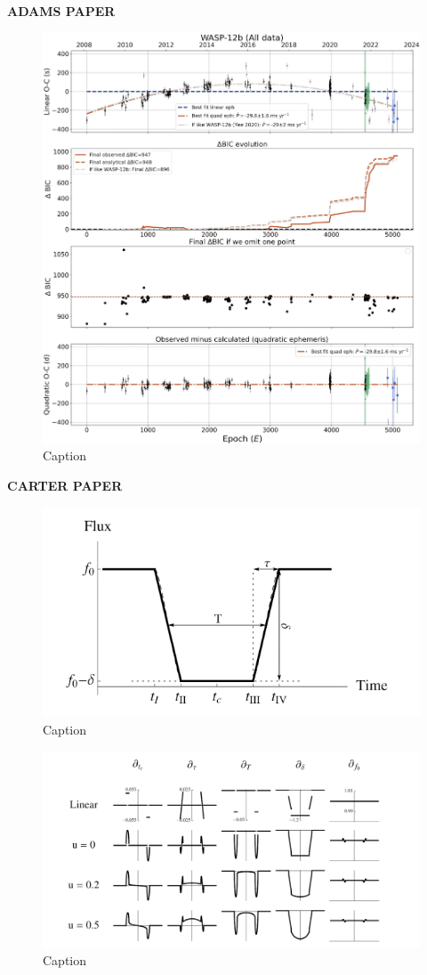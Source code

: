 \documentclass[oneside,12pt]{amsart}
\numberwithin{page}{section}
\begin{document}
\clearpage




\textbf{ADAMS PAPER}

\begin{figure}[htbp]
    \centering
    \includegraphics[width=\linewidth]{figs/adams_fig3.png}
    \caption{Caption}
    \label{fig:enter-label}
\end{figure}

\clearpage


\textbf{CARTER PAPER}

\begin{figure}[htbp]
    \centering
    \includegraphics[width=0.5\linewidth]{figs/carter_fig1.png}
    \caption{Caption}
    \label{fig:enter-label}
\end{figure}

\begin{figure}[htbp]
    \centering
    \includegraphics[width=0.5\linewidth]{figs/carter_fig2.png}
    \caption{Caption}
    \label{fig:enter-label}
\end{figure}
\end{document}
